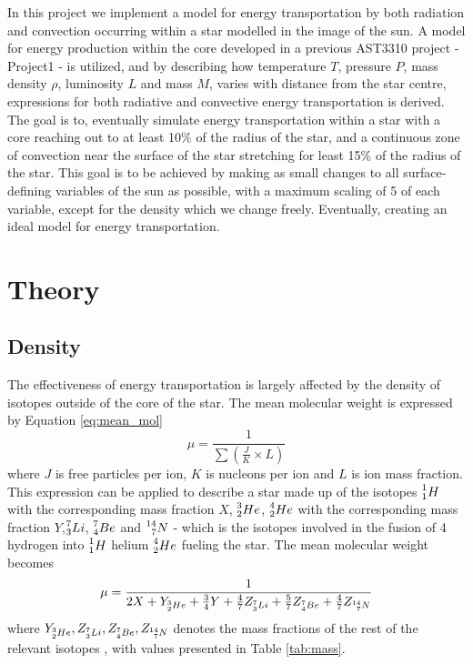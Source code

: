 \documentclass[10pt, nofootinbib, twocolumn]{revtex4-1}
\begin{document}
In this project we implement a model for energy transportation by both radiation and convection occurring within a star modelled in the image of the sun. A model for energy production within the core developed in a previous AST3310 project - Project1 - is utilized, and by describing how temperature $T$, pressure $P$, mass density $\rho$, luminosity $L$ and mass $M$, varies with distance from the star centre, expressions for both radiative and convective energy transportation is derived. \\ 

The goal is to, eventually simulate energy transportation within a star with a core reaching out to at least 10$\%$ of the radius of the star, and a continuous zone of convection near the surface of the star stretching for least 15$\%$ of the radius of the star. This goal is to be achieved by making as small changes to all surface-defining variables of the sun as possible, with a maximum scaling of 5 of each variable, except for the density which we change freely. Eventually, creating an ideal model for energy transportation. 






\section{Theory}\label{sec:theory}
\subsection{Density}
The effectiveness of energy transportation is largely affected by the density of isotopes outside of the core of the star. The mean molecular weight is expressed by Equation \eqref{eq:mean_mol} \cite{ast}
\begin{equation}\label{eq:mean_mol}
    \mu=\frac{1}{\sum(\frac{J}{K}\times L)}
\end{equation}
where $J$ is free particles per ion, $K$ is nucleons per ion and $L$ is ion mass fraction. This expression can be applied to describe a star made up of the isotopes $\prescript{1}{1}H$ with the corresponding mass fraction $X$, $\prescript{3}{2}He$, $\prescript{4}{2}He$ with the corresponding mass fraction $Y$,$\prescript{7}{3}Li$, $\prescript{7}{4}Be$ and $\prescript{14}{7}N$ - which is the isotopes involved in the fusion of 4 hydrogen into $\prescript{1}{1}H$ helium $\prescript{4}{2}He$ fueling the star. The mean molecular weight becomes 
\begin{equation}\label{eq:mean}
    \mu=\frac{1}{2X+Y_{\prescript{3}{2}He}+\frac{3}{4}Y+\frac{4}{7}Z_{\prescript{7}{3}Li}+\frac{5}{7}Z_{\prescript{7}{4}Be}+\frac{4}{7}Z_{\prescript{14}{7}N}}
\end{equation}
where $Y_{\prescript{3}{2}He}, Z_{\prescript{7}{3}Li}, Z_{\prescript{7}{4}Be}, Z_{\prescript{14}{7}N}$ denotes the mass fractions of the rest of the relevant isotopes \cite{ast}, with values presented in Table \ref{tab:mass}. \\
\end{document}
